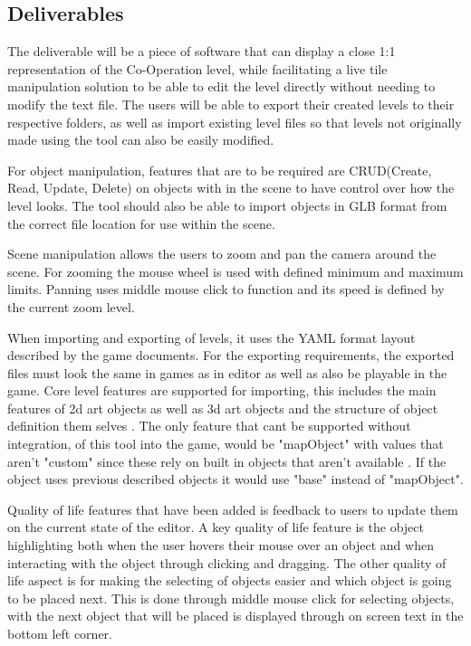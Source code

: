 \subsection{Deliverables}
The deliverable will be a piece of software that can display a close 1:1 representation of the Co-Operation level, while facilitating a live tile manipulation solution to be able to edit the level directly without needing to modify the text file. The users will be able to export their created levels to their respective folders, as well as import existing level files so that levels not originally made using the tool can also be easily modified.

For object manipulation, features that are to be required are CRUD(Create, Read, Update, Delete) on objects with in the scene to have control over how the level looks. The tool should also be able to import objects in GLB format from the correct file location for use within the scene.

Scene manipulation allows the users to zoom and pan the camera around the scene. For zooming the mouse wheel is used with defined minimum and maximum limits. Panning uses middle mouse click to function and its speed is defined by the current zoom level.  

When importing and exporting of levels, it uses the YAML format layout described by the game documents. For the exporting requirements, the exported files must look the same in games as in editor as well as also be playable in the game. Core level features are supported for importing, this includes the main features of 2d art objects  as well as 3d art objects  and the structure of object definition them selves . The only feature that cant be supported without integration, of this tool into the game, would be "mapObject" with values that aren't "custom" since these rely on built in objects that aren't available . If the object uses previous described objects it would use "base" instead of "mapObject". 

Quality of life features that have been added is feedback to users to update them on the current state of the editor. A key quality of life feature is the object highlighting both when the user hovers their mouse over an object and when interacting with the object through clicking and dragging. The other quality of life aspect is for making the selecting of objects easier and which object is going to be placed next.  This is done through middle mouse click for selecting objects, with the next object that will be placed is displayed through on screen text in the bottom left corner.

